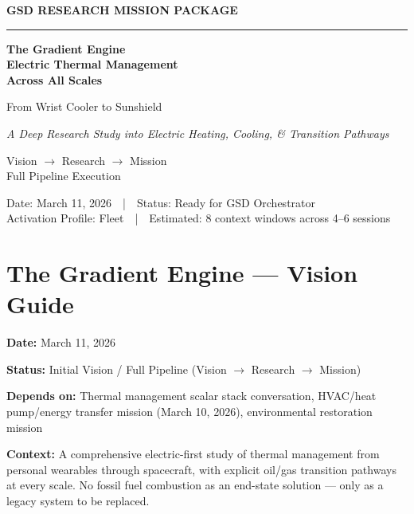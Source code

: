 \documentclass[11pt,letterpaper]{article}
\newcommand{\stageheader}[2]{%
  \noindent\colorbox{#2}{\makebox[\textwidth][l]{%
    \textcolor{white}{\bfseries\sffamily\hspace{6pt}#1\hspace{6pt}}}}%
  \vspace{0.5em}\par%
}
\newcommand{\metafield}[2]{\textbf{\sffamily #1} #2\par}
\begin{document}
\thispagestyle{empty}
\begin{center}
\vspace*{3cm}

{\small\sffamily\textcolor{primary}{\textbf{GSD RESEARCH MISSION PACKAGE}}}

\vspace{0.3cm}
\textcolor{bordergray}{\rule{8cm}{0.4pt}}

\vspace{1.5cm}
{\fontsize{28}{34}\selectfont\bfseries\sffamily\textcolor{primary}{The Gradient Engine\\[0.3em]Electric Thermal Management\\[0.3em]Across All Scales}}

\vspace{0.8cm}
{\Large\sffamily\textcolor{secondary}{From Wrist Cooler to Sunshield}}

\vspace{0.5cm}
{\large\sffamily\itshape\textcolor{tertiary}{A Deep Research Study into Electric Heating, Cooling, \& Transition Pathways}}

\vspace{3cm}
{\sffamily\textcolor{accent}{Vision $\rightarrow$ Research $\rightarrow$ Mission}}\\[0.3em]
{\small\sffamily\textcolor{accent}{Full Pipeline Execution}}

\vspace{3cm}
{\small\sffamily\textcolor{subtlegray}{Date: March 11, 2026~~|~~Status: Ready for GSD Orchestrator}}\\[0.3em]
{\small\sffamily\textcolor{subtlegray}{Activation Profile: Fleet~~|~~Estimated: 8 context windows across 4--6 sessions}}
\end{center}
\newpage

\tableofcontents
\newpage

\stageheader{STAGE 1 --- VISION DOCUMENT}{primary}

\section{The Gradient Engine --- Vision Guide}

\metafield{Date:}{March 11, 2026}
\metafield{Status:}{Initial Vision / Full Pipeline (Vision $\rightarrow$ Research $\rightarrow$ Mission)}
\metafield{Depends on:}{Thermal management scalar stack conversation, HVAC/heat pump/energy transfer mission (March 10, 2026), environmental restoration mission}
\metafield{Context:}{A comprehensive electric-first study of thermal management from personal wearables through spacecraft, with explicit oil/gas transition pathways at every scale. No fossil fuel combustion as an end-state solution --- only as a legacy system to be replaced.}
\end{document}
